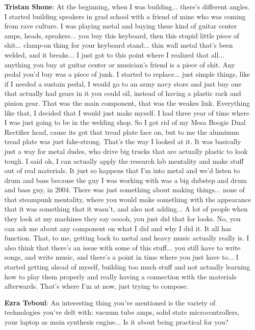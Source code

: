 \textbf{Tristan Shone}: At the beginning, when I was building... there's different angles. I started building speakers in grad school with a friend of mine who was coming from rave culture. I was playing metal and buying these kind of guitar center amps, heads, speakers... you buy this keyboard, then this stupid little piece of shit... clamp-on thing for your keyboard stand... thin wall metal that's been welded, and it breaks... I just got to this point where I realized that all... anything you buy at guitar center or musician's friend is a piece of shit. Any pedal you'd buy was a piece of junk. I started to replace... just simple things, like if I needed a sustain pedal, I would go to an army navy store and just buy one that actually had gears in it you could oil, instead of having a plastic rack and pinion gear. That was the main component, that was the weakes link. Everything like that, I decided that I would just make myself. I had three year of time where I was just going to be in the welding shop. So I got rid of my Mesa Boogie Dual Rectifier head, cause its got that tread plate face on, but to me the aluminum tread plate was just fake-strong. That's the way I looked at it. It was basically just a way for metal dudes, who drive big trucks that are actually plastic to look tough. I said oh, I can actually apply the research lab mentality and make stuff out of real materials. It just so happens that I'm into metal and we'd listen to drum and bass because the guy I was working with was a big dubstep and drum and bass guy, in 2004. There was just something about making things... none of that steampunk mentality, where you would make something with the appearance that it was something that it wasn't, and also not adding... A lot of people when they look at my machines they say ooooh, you just did that for looks. No, you can ask me about any component on what I did and why I did it. It all has function. That, to me, getting back to metal and heavy music actually really is. I also think that there's an issue with some of this stuff... you still have to write songs, and write music, and there's a point in time where you just have to... I started getting ahead of myself, building too much stuff and not actually learning how to play them properly and really having a connection with the materials afterwards. That's where I'm at now, just trying to compose. 

\textbf{Ezra Teboul}: An interesting thing you've mentioned is the variety of technologies you've delt with: vacuum tube amps, solid state microcontrollers, your laptop as main synthesis engine... Is it about being practical for you? 

